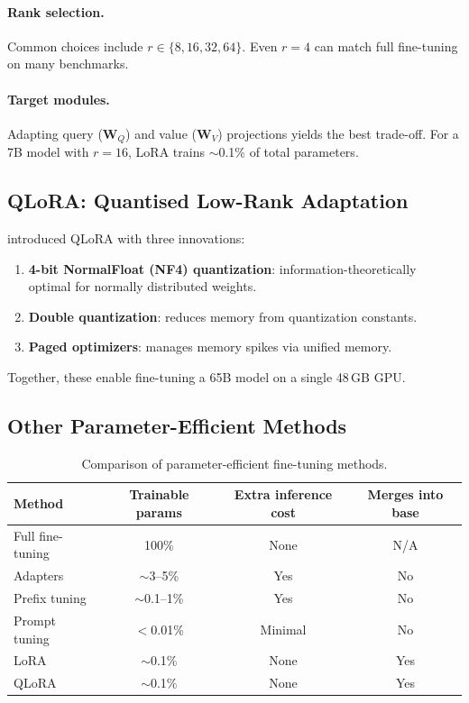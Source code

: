 \documentclass[12pt,a4paper]{report}
\begin{document}
\paragraph{Rank selection.} Common choices include $r \in \{8, 16, 32, 64\}$. Even $r = 4$ can match full fine-tuning on many benchmarks.

\paragraph{Target modules.} Adapting query ($\mathbf{W}_Q$) and value ($\mathbf{W}_V$) projections yields the best trade-off. For a 7B model with $r = 16$, LoRA trains $\sim$0.1\% of total parameters.

\subsection{QLoRA: Quantised Low-Rank Adaptation}
\label{sec:qlora}

\citet{dettmers2023qlora} introduced QLoRA with three innovations:
\begin{enumerate}[leftmargin=1.8em,itemsep=2pt]
\item \textbf{4-bit NormalFloat (NF4) quantization}: information-theoretically optimal for normally distributed weights.
\item \textbf{Double quantization}: reduces memory from quantization constants.
\item \textbf{Paged optimizers}: manages memory spikes via unified memory.
\end{enumerate}
Together, these enable fine-tuning a 65B model on a single 48\,GB GPU.

\subsection{Other Parameter-Efficient Methods}

\begin{table}[t]
  \centering
  \caption{Comparison of parameter-efficient fine-tuning methods.}
  \label{tab:peft-comparison}
  \begin{tabular}{@{}lccc@{}}
    \toprule
    \textbf{Method} & \textbf{Trainable params} & \textbf{Extra inference cost}
      & \textbf{Merges into base} \\
    \midrule
    Full fine-tuning              & 100\%          & None       & N/A \\
    Adapters \citep{houlsby2019adapters}
                                  & $\sim$3--5\%   & Yes        & No \\
    Prefix tuning \citep{li2021prefix}
                                  & $\sim$0.1--1\% & Yes        & No \\
    Prompt tuning \citep{lester2021prompt}
                                  & $<$0.01\%      & Minimal    & No \\
    LoRA \citep{hu2021lora}       & $\sim$0.1\%    & None       & Yes \\
    QLoRA \citep{dettmers2023qlora}
                                  & $\sim$0.1\%    & None       & Yes \\
    \bottomrule
  \end{tabular}
\end{table}
\end{document}
